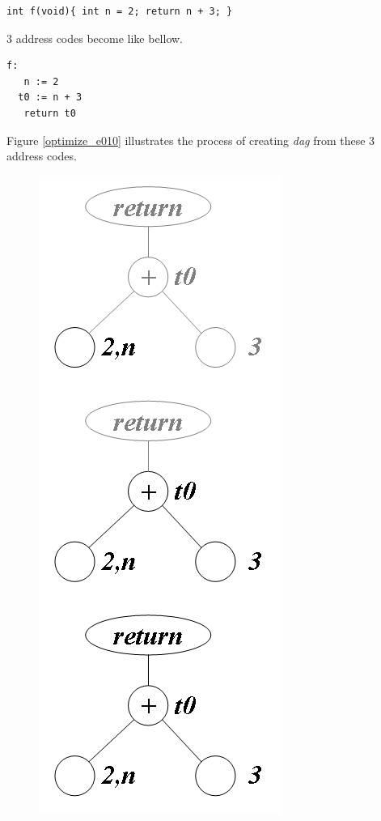 \begin{Example}
\label{optimize_e009}
\begin{verbatim}
int f(void){ int n = 2; return n + 3; }
\end{verbatim}
3 address codes become like bellow.
\begin{verbatim}
f:
   n := 2
  t0 := n + 3
   return t0
\end{verbatim}
Figure \ref{optimize_e010} illustrates the process of creating
{\em dag} from these 3 address codes.
\begin{figure}[htbp]
\begin{center}
\begin{htmlonly}
\includegraphics[width=0.392\linewidth,height=1.0\linewidth]{opt002.png}
\end{htmlonly}
\begin{latexonly}

\end{latexonly}
\end{center}
\end{figure}
\end{Example}
